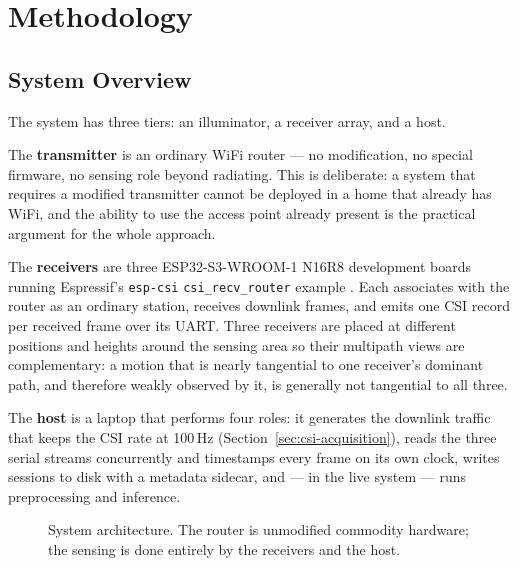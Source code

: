 \chapter{Methodology}
\label{ch:methodology}

\section{System Overview}

The system has three tiers: an illuminator, a receiver array, and a host.

The \textbf{transmitter} is an ordinary WiFi router --- no modification, no
special firmware, no sensing role beyond radiating. This is deliberate: a
system that requires a modified transmitter cannot be deployed in a home
that already has WiFi, and the ability to use the access point already
present is the practical argument for the whole approach.

The \textbf{receivers} are three ESP32-S3-WROOM-1 N16R8 development boards
running Espressif's \texttt{esp-csi} \texttt{csi\_recv\_router} example
\cite{espcsi}. Each associates with the router as an ordinary station,
receives downlink frames, and emits one CSI record per received frame over
its UART. Three receivers are placed at different positions and heights
around the sensing area so their multipath views are complementary: a motion
that is nearly tangential to one receiver's dominant path, and therefore
weakly observed by it, is generally not tangential to all three.

The \textbf{host} is a laptop that performs four roles: it generates the
downlink traffic that keeps the CSI rate at 100\,Hz
(Section~\ref{sec:csi-acquisition}), reads the three serial streams
concurrently and timestamps every frame on its own clock, writes sessions to
disk with a metadata sidecar, and --- in the live system --- runs
preprocessing and inference.

\begin{figure}[htbp]
  \centering
  \caption{System architecture. The router is unmodified commodity
  hardware; the sensing is done entirely by the receivers and the host.}
  \label{fig:architecture}
\end{figure}

